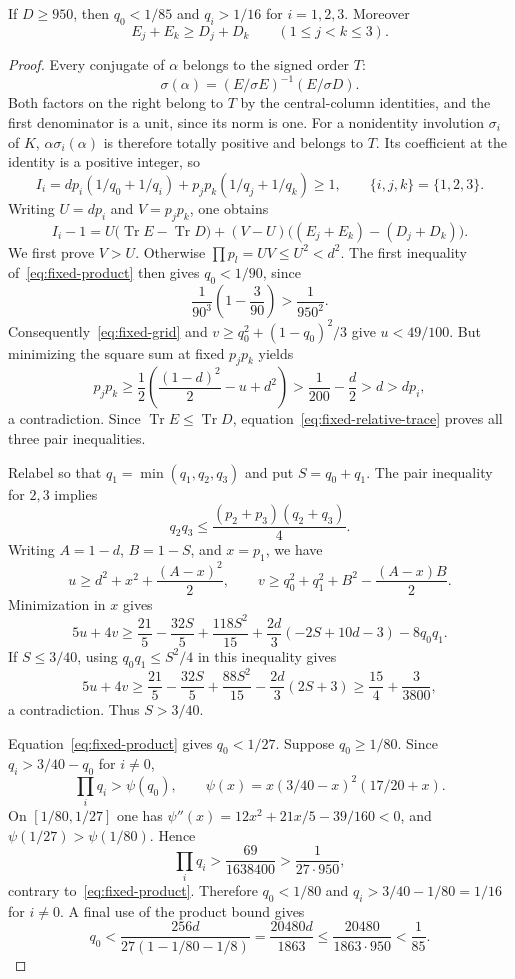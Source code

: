 \begin{lemma}\label{lem:fixed-relative-pairs}
If $D\ge950$, then $q_0<1/85$ and $q_i>1/16$ for
$i=1,2,3$. Moreover
\[
 E_j+E_k\ge D_j+D_k\qquad(1\le j<k\le3).
\]
\end{lemma}
\begin{proof}
Every conjugate of $\alpha$ belongs to the signed order $T$:
\[
 \sigma(\alpha)=(E/\sigma E)^{-1}(E/\sigma D).
\]
Both factors on the right belong to $T$ by the central-column
identities, and the first denominator is a unit, since its norm is one.
For a nonidentity involution $\sigma_i$ of $K$,
$\alpha\sigma_i(\alpha)$ is therefore totally positive and belongs to
$T$. Its coefficient at the identity is a positive integer, so
\[
 I_i=dp_i(1/q_0+1/q_i)+p_jp_k(1/q_j+1/q_k)\ge1,
 \qquad\{i,j,k\}=\{1,2,3\}.
\]
Writing $U=dp_i$ and $V=p_jp_k$, one obtains
\begin{equation}\label{eq:fixed-relative-trace}
 I_i-1=U\bigl(\operatorname{Tr}E-\operatorname{Tr}D\bigr)
 +(V-U)\bigl((E_j+E_k)-(D_j+D_k)\bigr).
\end{equation}
We first prove $V>U$. Otherwise $\prod p_l=UV\le U^2<d^2$.
The first inequality of~\eqref{eq:fixed-product} then gives $q_0<1/90$,
since
\[
 \frac1{90^3}\left(1-\frac3{90}\right)>\frac1{950^2}.
\]
Consequently~\eqref{eq:fixed-grid} and
$v\ge q_0^2+(1-q_0)^2/3$ give $u<49/100$. But minimizing the square
sum at fixed $p_jp_k$ yields
\[
 p_jp_k\ge\frac12\left(\frac{(1-d)^2}{2}-u+d^2\right)
 >\frac1{200}-\frac d2>d>dp_i,
\]
a contradiction. Since $\operatorname{Tr}E\le\operatorname{Tr}D$,
equation~\eqref{eq:fixed-relative-trace} proves all three pair
inequalities.

Relabel so that $q_1=\min(q_1,q_2,q_3)$ and put $S=q_0+q_1$.
The pair inequality for $2,3$ implies
\[
 q_2q_3\le\frac{(p_2+p_3)(q_2+q_3)}4.
\]
Writing $A=1-d$, $B=1-S$, and $x=p_1$, we have
\[
 u\ge d^2+x^2+\frac{(A-x)^2}{2},\qquad
 v\ge q_0^2+q_1^2+B^2-\frac{(A-x)B}{2}.
\]
Minimization in $x$ gives
\begin{equation}\label{eq:fixed-bootstrap}
 5u+4v\ge\frac{21}{5}-\frac{32S}{5}+\frac{118S^2}{15}
 +\frac{2d}{3}(-2S+10d-3)-8q_0q_1.
\end{equation}
If $S\le3/40$, using $q_0q_1\le S^2/4$ in this inequality gives
\[
 5u+4v\ge\frac{21}{5}-\frac{32S}{5}+\frac{88S^2}{15}
 -\frac{2d}{3}(2S+3)
 \ge\frac{15}{4}+\frac3{3800},
\]
a contradiction. Thus $S>3/40$.

Equation~\eqref{eq:fixed-product} gives $q_0<1/27$.
Suppose $q_0\ge1/80$. Since $q_i>3/40-q_0$ for $i\ne0$,
\[
 \prod_iq_i>
 \psi(q_0),\qquad
 \psi(x)=x(3/40-x)^2(17/20+x).
\]
On $[1/80,1/27]$ one has
$\psi''(x)=12x^2+21x/5-39/160<0$, and
$\psi(1/27)>\psi(1/80)$. Hence
\[
 \prod_iq_i>\frac{69}{1638400}>\frac1{27\cdot950},
\]
contrary to~\eqref{eq:fixed-product}. Therefore $q_0<1/80$ and
$q_i>3/40-1/80=1/16$ for $i\ne0$. A final use of the product bound gives
\[
 q_0<\frac{256d}{27(1-1/80-1/8)}
 =\frac{20480d}{1863}\le\frac{20480}{1863\cdot950}<\frac1{85}.
\]
\end{proof}


